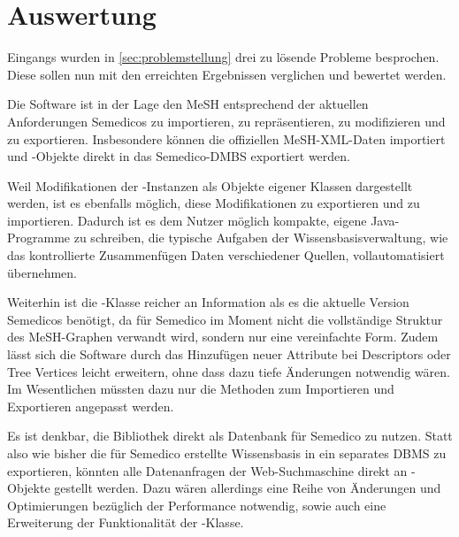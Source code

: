 \section{Auswertung}

Eingangs wurden in \autoref{sec:problemstellung} drei zu lösende Probleme besprochen. Diese sollen nun mit den erreichten Ergebnissen verglichen und bewertet werden. \par

Die Software ist in der Lage den MeSH entsprechend der aktuellen Anforderungen Semedicos zu importieren, zu repräsentieren, zu modifizieren und zu exportieren. Insbesondere können die offiziellen MeSH-XML-Daten importiert und -Objekte direkt in das Semedico-DMBS exportiert werden.\par

Weil Modifikationen der -Instanzen als Objekte eigener Klassen dargestellt werden, ist es ebenfalls möglich, diese Modifikationen zu exportieren und zu importieren. Dadurch ist es dem Nutzer möglich kompakte, eigene Java-Programme zu schreiben, die typische Aufgaben der Wissensbasisverwaltung, wie das kontrollierte Zusammenfügen Daten verschiedener Quellen, vollautomatisiert übernehmen.\par

Weiterhin ist die -Klasse reicher an Information als es die aktuelle Version Semedicos benötigt, da für Semedico im Moment nicht die vollständige Struktur des MeSH-Graphen verwandt wird, sondern nur eine vereinfachte Form. Zudem lässt sich die Software durch das Hinzufügen neuer Attribute bei Descriptors oder Tree Vertices leicht erweitern, ohne dass dazu tiefe Änderungen notwendig wären. Im Wesentlichen müssten dazu nur die Methoden zum Importieren und Exportieren angepasst werden. \par

Es ist denkbar, die Bibliothek direkt als Datenbank für Semedico zu nutzen. Statt also wie bisher die für Semedico erstellte Wissensbasis in ein separates DBMS zu exportieren, könnten alle Datenanfragen der Web-Suchmaschine direkt an -Objekte gestellt werden. Dazu wären allerdings eine Reihe von Änderungen und Optimierungen bezüglich der Performance notwendig, sowie auch eine Erweiterung der Funktionalität der -Klasse.\par

